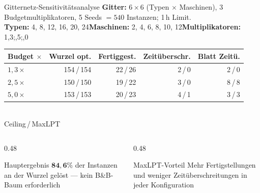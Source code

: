 \documentclass[fleqn,11pt,aspectratio=43]{beamer}
\begin{document}
\begin{frame}[shrink=8]{Gitternetz-Sensitivitätsanalyse}
  \textbf{Gitter:} $6{\times}6$ (Typen $\times$ Maschinen), 3 Budgetmultiplikatoren, 5 Seeds $=540$ Instanzen; 1\,h Limit.\\[0.15em]
  \footnotesize\textbf{Typen:} 4, 8, 12, 16, 20, 24\quad\textbullet\quad\textbf{Maschinen:} 2, 4, 6, 8, 10, 12\quad\textbullet\quad\textbf{Multiplikatoren:} 1,3;,5;,0\normalsize

  \begin{center}\small
  \begin{tabular}{lrrrr}
    \toprule
    Budget $\times$ & Wurzel opt. & Fertiggest. & Zeitüberschr. & Blatt Zeitü.\\
    \midrule
    $1{,}3\times$ & 154\,/\,154 & 22\,/\,26 & 2\,/\,0 & 2\,/\,0\\
    $2{,}5\times$ & 150\,/\,150 & 19\,/\,22 & 3\,/\,0 & 8\,/\,8\\
    $5{,}0\times$ & 153\,/\,153 & 20\,/\,23 & 4\,/\,1 & 3\,/\,3\\
    \bottomrule
  \end{tabular}\\[0.2em]
  \footnotesize Ceiling\,/\,MaxLPT
  \end{center}

  \begin{columns}[T]
    \begin{column}{0.48\textwidth}
      \begin{alertblock}{Hauptergebnis}
        $\mathbf{84{,}6\%}$ der Instanzen an der Wurzel gelöst — kein B\&B-Baum erforderlich
      \end{alertblock}
    \end{column}
    \begin{column}{0.48\textwidth}
      \begin{block}{MaxLPT-Vorteil}
        Mehr Fertigstellungen und weniger Zeitüberschreitungen in jeder Konfiguration
      \end{block}
    \end{column}
  \end{columns}
\end{frame}
\end{document}
